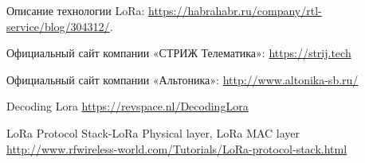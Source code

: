 \documentclass[a4paper,14pt]{extarticle} %
\begin{document}
	\newpage
	\newpage
	\newpage
	\newpage
	\newpage
	
	\begin{thebibliography}
		{} \bibitem{}\emph{}Описание технологии LoRa:
		\url{https://habrahabr.ru/company/rtl-service/blog/304312/}.
		 
		{} \bibitem{}\emph{}Официальный сайт компании «СТРИЖ Телематика»:
		\url{https://strij.tech}
		
		{} \bibitem{}\emph{}
		Официальный сайт компании «Альтоника»:
		\url{http://www.altonika-sb.ru/}
		
		{} \bibitem{}\emph{}Decoding Lora
		\url{https://revspace.nl/DecodingLora}
	
		{} \bibitem{}\emph{}LoRa Protocol Stack-LoRa Physical layer, LoRa MAC layer
		\url{http://www.rfwireless-world.com/Tutorials/LoRa-protocol-stack.html}
	\end{thebibliography}
\end{document}
